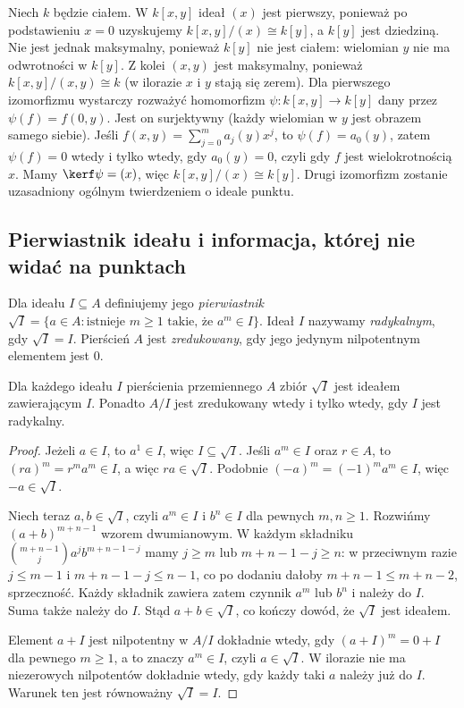 \begin{przyklad}
Niech $k$ będzie ciałem. W $k[x,y]$ ideał $(x)$ jest pierwszy,
ponieważ po podstawieniu $x=0$ uzyskujemy
$k[x,y]/(x)\cong k[y]$, a $k[y]$ jest dziedziną.
Nie jest jednak maksymalny, ponieważ $k[y]$ nie jest ciałem:
wielomian $y$ nie ma odwrotności w $k[y]$.
Z kolei $(x,y)$ jest maksymalny, ponieważ
$k[x,y]/(x,y)\cong k$ (w ilorazie $x$ i $y$ stają się zerem).
Dla pierwszego izomorfizmu wystarczy rozważyć homomorfizm
$\psi\colon k[x,y]\to k[y]$ dany przez $\psi(f)=f(0,y)$.
Jest on surjektywny (każdy wielomian w $y$ jest obrazem samego siebie).
Jeśli $f(x,y)=\sum_{j=0}^m a_j(y)x^j$, to $\psi(f)=a_0(y)$,
zatem $\psi(f)=0$ wtedy i tylko wtedy, gdy $a_0(y)=0$,
czyli gdy $f$ jest wielokrotnością $x$. Mamy $\kerf\psi=(x)$,
więc $k[x,y]/(x)\cong k[y]$. Drugi izomorfizm zostanie
uzasadniony ogólnym twierdzeniem o ideale punktu.
\end{przyklad}

\subsection{Pierwiastnik ideału i informacja, której nie widać na punktach}

\begin{definicja}
Dla ideału $I\subseteq A$ definiujemy jego \emph{pierwiastnik}
$\sqrt I=\{a\in A:\text{istnieje }m\ge1\text{ takie, że }a^m\in I\}$.
Ideał $I$ nazywamy \emph{radykalnym}, gdy $\sqrt I=I$.
Pierścień $A$ jest \emph{zredukowany}, gdy jego jedynym
nilpotentnym elementem jest $0$.
\end{definicja}

\begin{twierdzenie}
\label{tw:pierwiastek}
Dla każdego ideału $I$ pierścienia przemiennego $A$
zbiór $\sqrt I$ jest ideałem zawierającym $I$.
Ponadto $A/I$ jest zredukowany wtedy i tylko wtedy, gdy $I$ jest radykalny.
\end{twierdzenie}
\begin{proof}
Jeżeli $a\in I$, to $a^1\in I$, więc $I\subseteq\sqrt I$.
Jeśli $a^m\in I$ oraz $r\in A$, to $(ra)^m=r^ma^m\in I$,
a więc $ra\in\sqrt I$. Podobnie $(-a)^m=(-1)^ma^m\in I$,
więc $-a\in\sqrt I$.

Niech teraz $a,b\in\sqrt I$, czyli $a^m\in I$ i $b^n\in I$
dla pewnych $m,n\ge1$. Rozwińmy $(a+b)^{m+n-1}$
wzorem dwumianowym. W każdym składniku
$\binom{m+n-1}{j}a^jb^{m+n-1-j}$
mamy $j\ge m$ lub $m+n-1-j\ge n$:
w przeciwnym razie $j\le m-1$ i $m+n-1-j\le n-1$,
co po dodaniu dałoby $m+n-1\le m+n-2$, sprzeczność.
Każdy składnik zawiera zatem czynnik $a^m$ lub $b^n$
i należy do $I$. Suma także należy do $I$.
Stąd $a+b\in\sqrt I$, co kończy dowód, że $\sqrt I$ jest ideałem.

Element $a+I$ jest nilpotentny w $A/I$ dokładnie wtedy, gdy
$(a+I)^m=0+I$ dla pewnego $m\ge1$, a to znaczy $a^m\in I$,
czyli $a\in\sqrt I$. W ilorazie nie ma niezerowych nilpotentów
dokładnie wtedy, gdy każdy taki $a$ należy już do $I$.
Warunek ten jest równoważny $\sqrt I=I$.
\end{proof}

